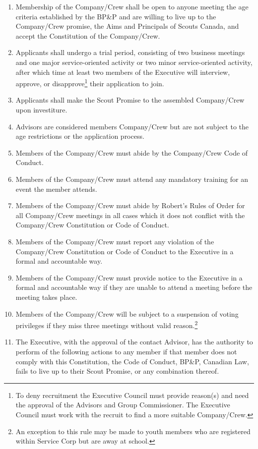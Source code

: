 \begin{enumerate}
    \item Membership of the Company/Crew shall be open to anyone meeting the age criteria established by the BP\&P and are willing to live up to the Company/Crew promise, the Aims and Principals of Scouts Canada, and accept the Constitution of the Company/Crew.
    \item Applicants shall undergo a trial period, consisting of two business meetings and one major service-oriented activity or two minor service-oriented activity, after which time at least two members of the Executive will interview, approve, or disapprove\footnote{To deny recruitment the Executive Council must provide reason(s) and need the approval of the Advisors and Group Commissioner. The Executive Council must work with the recruit to find a more suitable Company/Crew.} their application to join.
    \item Applicants shall make the Scout Promise to the assembled Company/Crew upon investiture.
    \item Advisors are considered members Company/Crew but are not subject to the age restrictions or the application process.
    \item Members of the Company/Crew must abide by the Company/Crew Code of Conduct.
    \item Members of the Company/Crew must attend any mandatory training for an event the member attends.
    \item Members of the Company/Crew must abide by Robert's Rules of Order for all Company/Crew meetings in all cases which it does not conflict with the Company/Crew Constitution or Code of Conduct.
    \item Members of the Company/Crew must report any violation of the Company/Crew Constitution or Code of Conduct to the Executive in a formal and accountable way.
    \item Members of the Company/Crew must provide notice to the Executive in a formal and accountable way if they are unable to attend a meeting before the meeting takes place.
    \item Members of the Company/Crew will be subject to a suspension of voting privileges if they miss three meetings without valid reason.\footnote{An exception to this rule may be made to youth members who are registered within Service Corp but are away at school.}
    \item The Executive, with the approval of the contact Advisor, has the authority to perform of the following actions to any member if that member does not comply with this Constitution, the Code of Conduct, BP\&P, Canadian Law, fails to live up to their Scout Promise, or any combination thereof.

\end{enumerate}
